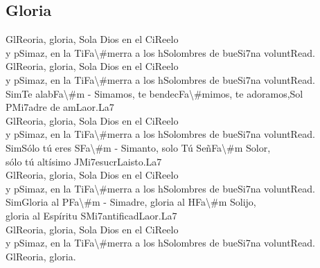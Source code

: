 \vspace{-1em}
\subsection{Gloria}
\vspace{-2em}
\begin{center}
{\Large
Gl\ac{Re}oria, gloria, \ac{Sol}a Dios en el Ci\ac{Re}elo\\
y p\ac{Sim}az, en la Ti\ac{Fa\#m}erra a los h\ac{Sol}ombres de bue\ac{Si7}na volunt\ac{Re}ad.\\

Gl\ac{Re}oria, gloria, \ac{Sol}a Dios en el Ci\ac{Re}elo\\
y p\ac{Sim}az, en la Ti\ac{Fa\#m}erra a los h\ac{Sol}ombres de bue\ac{Si7}na volunt\ac{Re}ad.\\

\ac{Sim}Te alab\ac{Fa\#m - Sim}amos, te bendec\ac{Fa\#m}imos, te adoramos,\ac{Sol}\\
P\ac{Mi7}adre de am\ac{La}or.\ac{La7}\\

Gl\ac{Re}oria, gloria, \ac{Sol}a Dios en el Ci\ac{Re}elo\\
y p\ac{Sim}az, en la Ti\ac{Fa\#m}erra a los h\ac{Sol}ombres de bue\ac{Si7}na volunt\ac{Re}ad.\\

\ac{Sim}Sólo tú eres S\ac{Fa\#m - Sim}anto, solo Tú Señ\ac{Fa\#m  Sol}or,\\
sólo tú altísimo J\ac{Mi7}esucr\ac{La}isto.\ac{La7}\\

Gl\ac{Re}oria, gloria, \ac{Sol}a Dios en el Ci\ac{Re}elo\\
y p\ac{Sim}az, en la Ti\ac{Fa\#m}erra a los h\ac{Sol}ombres de bue\ac{Si7}na volunt\ac{Re}ad.\\

\ac{Sim}Gloria al P\ac{Fa\#m - Sim}adre, gloria al H\ac{Fa\#m  Sol}ijo, \\
gloria al Espíritu S\ac{Mi7}antificad\ac{La}or.\ac{La7}\\

Gl\ac{Re}oria, gloria, \ac{Sol}a Dios en el Ci\ac{Re}elo\\
y p\ac{Sim}az, en la Ti\ac{Fa\#m}erra a los h\ac{Sol}ombres de bue\ac{Si7}na volunt\ac{Re}ad.\\

Gl\ac{Re}oria, gloria.\\
}
\end{center}